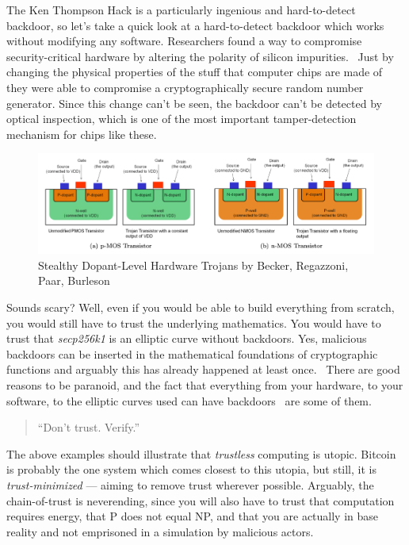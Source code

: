 The Ken Thompson Hack is a particularly ingenious and hard-to-detect backdoor,
so let's take a quick look at a hard-to-detect backdoor which works without
modifying any software. Researchers found a way to compromise security-critical
hardware by altering the polarity of silicon
impurities.~\cite{becker2013stealthy} Just by changing the physical properties
of the stuff that computer chips are made of they were able to compromise a
cryptographically secure random number generator. Since this change can't be
seen, the backdoor can't be detected by optical inspection, which is one of the
most important tamper-detection mechanism for chips like these.

\begin{figure}
  \includegraphics{assets/images/stealthy-hardware-trojan.png}
  \caption{Stealthy Dopant-Level Hardware Trojans by Becker, Regazzoni, Paar, Burleson}
  \label{fig:stealthy-hardware-trojan}
\end{figure}

Sounds scary? Well, even if you would be able to build everything from
scratch, you would still have to trust the underlying mathematics. You
would have to trust that \textit{secp256k1} is an elliptic curve without
backdoors. Yes, malicious backdoors can be inserted in the mathematical
foundations of cryptographic functions and arguably this has already
happened at least once.~\cite{wiki:Dual_EC_DRBG} There are good reasons to be paranoid, and the
fact that everything from your hardware, to your software, to the
elliptic curves used can have backdoors~\cite{wiki:backdoors} are some of them.

\begin{quotation}
``Don't trust. Verify.''
\end{quotation}

The above examples should illustrate that \textit{trustless} computing is
utopic. Bitcoin is probably the one system which comes closest to this
utopia, but still, it is \textit{trust-minimized} --- aiming to remove trust
wherever possible. Arguably, the chain-of-trust is neverending, since
you will also have to trust that computation requires energy, that P
does not equal NP, and that you are actually in base reality and not
emprisoned in a simulation by malicious actors.

